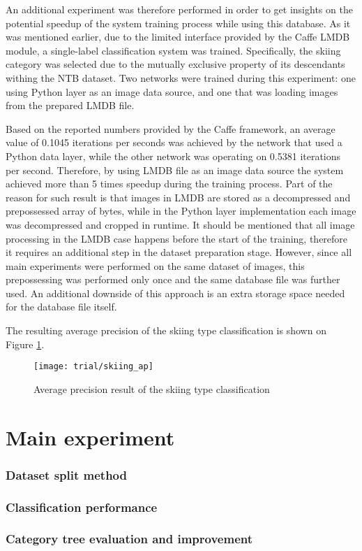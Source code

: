     An additional experiment was therefore performed in order to get insights on the potential speedup of the system training process while using this database. As it was mentioned earlier, due to the limited interface provided by the Caffe LMDB module, a single-label classification system was trained. Specifically, the skiing category was selected due to the mutually exclusive property of its descendants withing the NTB dataset. Two networks were trained during this experiment: one using Python layer as an image data source, and one that was loading images from the prepared LMDB file.
    
    Based on the reported numbers provided by the Caffe framework, an average value of 0.1045 iterations per seconds was achieved by the network that used a Python data layer, while the other network was operating on 0.5381 iterations per second. Therefore, by using LMDB file as an image data source the system achieved more than 5 times speedup during the training process. Part of the reason for such result is that images in LMDB are stored as a decompressed and prepossessed array of bytes, while in the Python layer implementation each image was decompressed and cropped in runtime. It should be mentioned that all image processing in the LMDB case happens before the start of the training, therefore it requires an additional step in the dataset preparation stage. However, since all main experiments were performed on the same dataset of images, this prepossessing was performed only once and the same database file was further used. An additional downside of this approach is an extra storage space needed for the database file itself.
    
    The resulting average precision of the skiing type classification is shown on Figure \ref{fig:trial-skiing-ap}.
    
    \begin{figure}[H]
        \centering
        \texttt{[image: trial/skiing\_ap]}
        \caption{Average precision result of the skiing type classification}
        \label{fig:trial-skiing-ap}
    \end{figure}
    

\section{Main experiment}
    \subsubsection{Dataset split method}
    \label{sec:split-comparison}
    \subsubsection{Classification performance}
    \subsubsection{Category tree evaluation and improvement}
    \label{sec:tree-eval}
